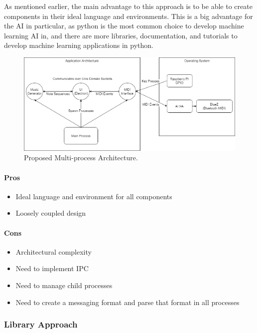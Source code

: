 As mentioned earlier, the main advantage to this approach is to be able to create
components in their ideal language and environments. This is a big advantage for the AI in
particular, as python is the most common choice to develop machine learning AI in, and
there are more libraries, documentation, and tutorials to develop machine learning
applications in python.

\begin{figure}[h!]
  \centering
  \includegraphics[width=\linewidth]{image/multiprocess.png}
  \caption{Proposed Multi-process Architecture.}
  \label{fig:multiprocess}
\end{figure}

\paragraph{Pros}

\begin{itemize}
  \item Ideal language and environment for all components
  \item Loosely coupled design
\end{itemize}

\paragraph{Cons}

\begin{itemize}
  \item Architectural complexity
  \item Need to implement IPC
  \item Need to manage child processes
  \item Need to create a messaging format and parse that format in all processes
\end{itemize}

\subsubsection{Library Approach}

